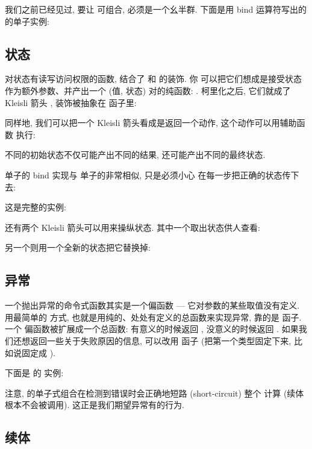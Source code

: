 我们之前已经见过, 要让  可组合,  必须是一个幺半群.
下面是用 bind 运算符写出的  的单子实例:


\subsection{状态}

对状态有读写访问权限的函数, 结合了  和  的装饰. 你
可以把它们想成是接受状态作为额外参数、并产出一个 (值, 状态) 对的纯函数:
. 柯里化之后, 它们就成了 Kleisli 箭头
, 装饰被抽象在  函子里:

同样地, 我们可以把一个 Kleisli 箭头看成是返回一个动作, 这个动作可以用辅助函数
执行:

不同的初始状态不仅可能产出不同的结果, 还可能产出不同的最终状态.

 单子的 bind 实现与  单子的非常相似, 只是必须小心
在每一步把正确的状态传下去:

这是完整的实例:

还有两个 Kleisli 箭头可以用来操纵状态. 其中一个取出状态供人查看:

另一个则用一个全新的状态把它替换掉:


\subsection{异常}

一个抛出异常的命令式函数其实是一个偏函数 --- 它对参数的某些取值没有定义. 用最简单的
方式, 也就是用纯的、处处有定义的总函数来实现异常, 靠的是  函子. 一个
偏函数被扩展成一个总函数: 有意义的时候返回 , 没意义的时候返回
. 如果我们还想返回一些关于失败原因的信息, 可以改用 
函子 (把第一个类型固定下来, 比如说固定成 ).

下面是  的  实例:

注意,  的单子式组合在检测到错误时会正确地短路 (short-circuit) 整个
计算 (续体  根本不会被调用). 这正是我们期望异常有的行为.

\subsection{续体}

